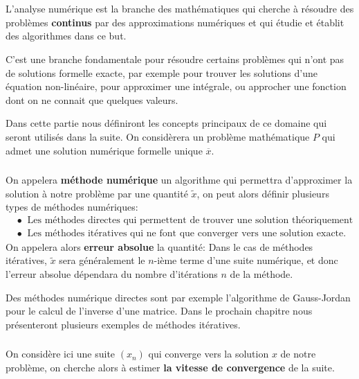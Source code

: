 \chapter*{}

L'analyse numérique est la branche des mathématiques qui cherche à résoudre des problèmes \textbf{continus} par des approximations numériques et qui étudie et établit des algorithmes dans ce but.\<

C'est une branche fondamentale pour résoudre certains problèmes qui n'ont pas de solutions formelle exacte, par exemple pour trouver les solutions d'une équation non-linéaire, pour approximer une intégrale, ou approcher une fonction dont on ne connait que quelques valeurs.\<

Dans cette partie nous définiront les concepts principaux de ce domaine qui seront utilisés dans la suite. On considèrera un problème mathématique \(P\) qui admet une solution numérique formelle unique \(\overline{x}\).

\subsection*{}
On appelera \textbf{méthode numérique} un algorithme qui permettra d'approximer la solution à notre problème par une quantité \(\widetilde{x}\), on peut alors définir plusieurs types de méthodes numériques:
\begin{align*}
   &\bullet \;\; \text{Les méthodes directes qui permettent de trouver une solution théoriquement exacte en temps fini.}\\
   &\bullet \;\; \text{Les méthodes itératives qui ne font que converger vers une solution exacte.}
\end{align*}
On appelera alors \textbf{erreur absolue} la quantité:
Dans le cas de méthodes itératives, \(\widetilde{x}\) sera généralement le \(n\)-ième terme d'une suite numérique, et donc l'erreur absolue dépendara du nombre d'itérations \(n\) de la méthode.\<

Des méthodes numérique directes sont par exemple l'algorithme de Gauss-Jordan pour le calcul de l'inverse d'une matrice. Dans le prochain chapitre nous présenteront plusieurs exemples de méthodes itératives.\

\subsection*{}
On considère ici une suite \((x_n)\) qui converge vers la solution \(x\) de notre problème, on cherche alors à estimer \textbf{la vitesse de convergence} de la suite.\<

